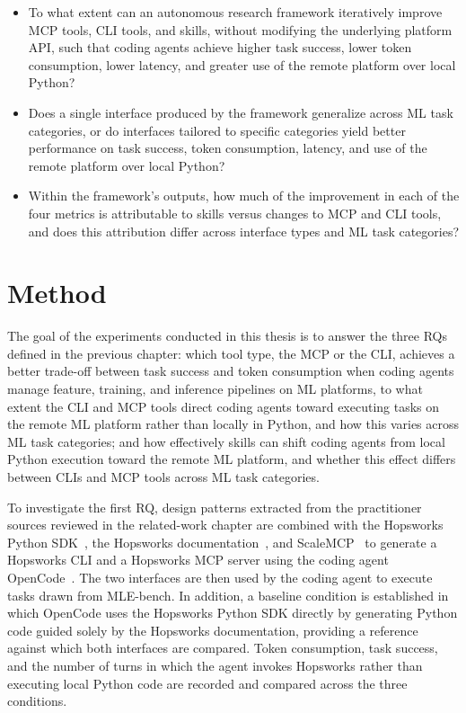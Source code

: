 \documentclass[
english,                 %
bibtex,                  %
includeExtraAbstracts, %
]{kththesis}
\numberwithin{listing}{chapter}
\begin{document}
\glsresetall
\begin{itemize}
\item To what extent can an autonomous research framework iteratively improve \gls{MCP} tools, \gls{CLI} tools, and skills, without modifying the underlying platform API, such that coding agents achieve higher task success, lower token consumption, lower latency, and greater use of the remote platform over local Python?
\item Does a single interface produced by the framework generalize across \gls{ML} task categories, or do interfaces tailored to specific categories yield better performance on task success, token consumption, latency, and use of the remote platform over local Python?
\item Within the framework's outputs, how much of the improvement in each of the four metrics is attributable to skills versus changes to \gls{MCP} and \gls{CLI} tools, and does this attribution differ across interface types and \gls{ML} task categories?
\end{itemize}

\cleardoublepage

\chapter{Method}

\glsresetall

The goal of the experiments conducted in this thesis is to answer the three \glspl{RQ} defined in the previous chapter: which tool type, the \gls{MCP} or the \gls{CLI}, achieves a better trade-off between task success and token consumption when coding agents manage feature, training, and inference pipelines on \gls{ML} platforms, to what extent the \gls{CLI} and \gls{MCP} tools direct coding agents toward executing tasks on the remote \gls{ML} platform rather than locally in Python, and how this varies across \gls{ML} task categories; and how effectively skills can shift coding agents from local Python execution toward the remote \gls{ML} platform, and whether this effect differs between \glspl{CLI} and \gls{MCP} tools across \gls{ML} task categories.

To investigate the first \gls{RQ}, design patterns extracted from the practitioner sources reviewed in the related-work chapter are combined with the Hopsworks Python \gls{SDK}~\cite{hopsworks_ab_logicalclockshopsworks-api_2026}, the Hopsworks documentation~\cite{hopsworks_ab_hopsworks_2026}, and Scale\gls{MCP}~\cite{marcelloni_scalemcp_2026} to generate a Hopsworks \gls{CLI} and a Hopsworks \gls{MCP} server using the coding agent OpenCode~\cite{anomaly_innovations_inc_anomalycoopencode_2026}. The two interfaces are then used by the coding agent to execute tasks drawn from \gls{MLE}-bench. In addition, a baseline condition is established in which OpenCode uses the Hopsworks Python \gls{SDK} directly by generating Python code guided solely by the Hopsworks documentation, providing a reference against which both interfaces are compared. Token consumption, task success, and the number of turns in which the agent invokes Hopsworks rather than executing local Python code are recorded and compared across the three conditions.
\end{document}

